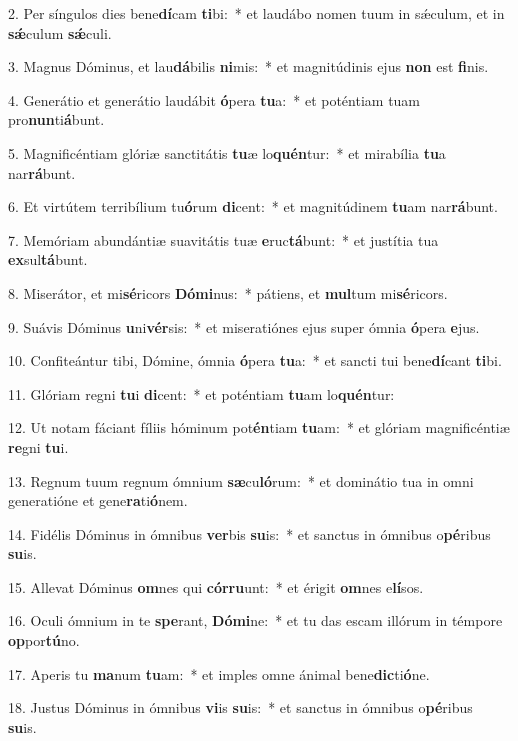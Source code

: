 2. Per síngulos dies bene\textbf{dí}cam \textbf{ti}bi:~*  et laudábo nomen tuum in sǽculum, et in \textbf{sǽ}culum \textbf{sǽ}culi.\

3. Magnus Dóminus, et lau\textbf{dá}bilis \textbf{ni}mis:~*  et magnitúdinis ejus \textbf{non} est \textbf{fi}nis.\

4. Generátio et generátio laudábit \textbf{ó}pera \textbf{tu}a:~*  et poténtiam tuam pro\textbf{nun}ti\textbf{á}bunt.\

5. Magnificéntiam glóriæ sanctitátis \textbf{tu}æ lo\textbf{quén}tur:~*  et mirabília \textbf{tu}a nar\textbf{rá}bunt.\

6. Et virtútem terribílium tu\textbf{ó}rum \textbf{di}cent:~*  et magnitúdinem \textbf{tu}am nar\textbf{rá}bunt.\

7. Memóriam abundántiæ suavitátis tuæ \textbf{e}ruc\textbf{tá}bunt:~*  et justítia tua \textbf{ex}sul\textbf{tá}bunt.\

8. Miserátor, et mi\textbf{sé}ricors \textbf{Dó}\textbf{mi}nus:~*  pátiens, et \textbf{mul}tum mi\textbf{sé}ricors.\

9. Suávis Dóminus \textbf{u}ni\textbf{vér}sis:~*  et miseratiónes ejus super ómnia \textbf{ó}pera \textbf{e}jus.\

10. Confiteántur tibi, Dómine, ómnia \textbf{ó}pera \textbf{tu}a:~*  et sancti tui bene\textbf{dí}cant \textbf{ti}bi.\

11. Glóriam regni \textbf{tu}i \textbf{di}cent:~*  et poténtiam \textbf{tu}am lo\textbf{quén}tur:\

12. Ut notam fáciant fíliis hóminum pot\textbf{én}tiam \textbf{tu}am:~*  et glóriam magnificéntiæ \textbf{re}gni \textbf{tu}i.\

13. Regnum tuum regnum ómnium \textbf{sæ}cu\textbf{ló}rum:~*  et dominátio tua in omni generatióne et gene\textbf{ra}ti\textbf{ó}nem.\

14. Fidélis Dóminus in ómnibus \textbf{ver}bis \textbf{su}is:~*  et sanctus in ómnibus o\textbf{pé}ribus \textbf{su}is.\

15. Allevat Dóminus \textbf{om}nes qui \textbf{cór}\textbf{ru}unt:~*  et érigit \textbf{om}nes e\textbf{lí}sos.\

16. Oculi ómnium in te \textbf{spe}rant, \textbf{Dó}\textbf{mi}ne:~*  et tu das escam illórum in témpore \textbf{op}por\textbf{tú}no.\

17. Aperis tu \textbf{ma}num \textbf{tu}am:~*  et imples omne ánimal bene\textbf{dic}ti\textbf{ó}ne.\

18. Justus Dóminus in ómnibus \textbf{vi}is \textbf{su}is:~*  et sanctus in ómnibus o\textbf{pé}ribus \textbf{su}is.\

